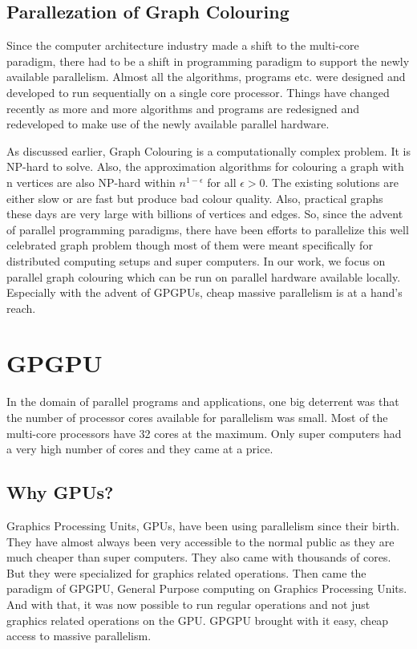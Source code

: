 \documentclass[MTech]{iitmdiss}
\begin{document}
\subsection{Parallezation of Graph Colouring}
Since the computer architecture industry made a shift to the multi-core paradigm, there had to be a shift in programming paradigm to support the newly available parallelism. Almost all the algorithms, programs etc. were designed and developed to run sequentially on a single core processor. Things have changed recently as more and more algorithms and programs are redesigned and redeveloped to make use of the newly available parallel hardware.

As discussed earlier, Graph Colouring is a computationally complex problem. It is NP-hard to solve. Also, the approximation algorithms for colouring a graph with n vertices are also NP-hard within $n^{1-\epsilon}$ for all $\epsilon > 0$. The existing solutions are either slow or are fast but produce bad colour quality. Also, practical graphs these days are very large with billions of vertices and edges. So, since the advent of parallel programming paradigms, there have been efforts to parallelize this well celebrated graph problem though most of them were meant specifically for distributed computing setups and super computers. In our work, we focus on parallel graph colouring which can be run on parallel hardware available locally. Especially with the advent of GPGPUs, cheap massive parallelism is at a hand's reach.
\section{GPGPU}
In the domain of parallel programs and applications, one big deterrent was that the number of processor cores available for parallelism was small. Most of the multi-core processors have 32 cores at the maximum. Only super computers had a very high number of cores and they came at a price. 
\subsection{Why GPUs?}
Graphics Processing Units, GPUs, have been using parallelism since their birth. They have almost always been very accessible to the normal public as they are much cheaper than super computers. They also came with thousands of cores. But they were specialized for graphics related operations. Then came the paradigm of GPGPU, General Purpose computing on Graphics Processing Units. And with that, it was now possible to run regular operations and not just graphics related operations on the GPU. GPGPU brought with it easy, cheap access to massive parallelism.
\end{document}
